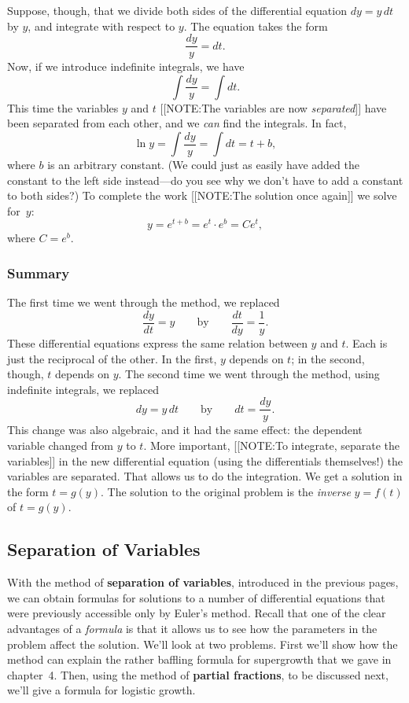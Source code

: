 Suppose, though, that we divide both sides of the differential
equation $dy = y \, dt$ by $y$, and integrate with respect to $y$.
The equation takes the form
	\[
\dfrac{dy}{y} = dt.
\]
Now, if we introduce indefinite integrals, we have
	\[
\int \dfrac{dy}{y} = \int dt.
\]
This time the variables $y$ and $t$ 
[[NOTE:The variables  are now \emph{separated}]]
have been separated from each other, and we {\em can\/} find the
integrals.  In fact,
	\[
\ln{y} = \int \dfrac{dy}{y} = \int dt = t + b,
\]
where $b$ is an arbitrary constant. (We could just as easily have
added the constant to the left side instead---do you see why we don't
have to add a constant to both sides?)  To complete the work 
[[NOTE:The solution  once again]]
we solve for~$y$:
	\[
y = e^{t + b} = e^t \cdot e^b = Ce^t,
\]
where $C = e^b$.


\subsubsection{Summary}
\label{subsubsec:summary}

The first time we went through the method, we replaced 
	\[
\dfrac{dy}{dt} = y \qquad \mbox{by} \qquad \dfrac{dt}{dy} = \dfrac{1}{y}.
\]
These differential equations express the same relation between $y$ and
$t$.  Each is just the reciprocal of the other.  In the first, $y$
depends on $t$; in the second, though, $t$ depends on $y$.  The second
time we went through the method, using indefinite integrals, we
replaced
	\[
dy = y \, dt \qquad \mbox{by} \qquad dt = \dfrac{dy}{y}.
\]
This change was also algebraic, and it had the same effect: the
dependent variable changed from $y$ to $t$.  More important,
[[NOTE:To integrate,  separate the variables]]
in the new differential equation (using the differentials themselves!)
the variables are separated.  That allows us to do the integration.
We get a solution in the form $t = g(y)$.  The solution to the
original problem is the {\em inverse\/} $y = f(t)$ of $t = g(y)$.

\subsection{Separation of Variables}
\label{subsec:separation-of-variables}

With the method of {\bf separation of variables}, introduced in the
previous pages, we can obtain formulas for solutions to a number of
differential equations that were previously accessible only by Euler's
method.  Recall that one of the clear advantages of a {\em formula\/}
is that it allows us to see how the parameters in the problem affect
the solution.  We'll look at two problems.  First we'll show how the
method can explain the rather baffling formula for supergrowth that we
gave in chapter~4.  Then, using the method of {\bf partial fractions},
to be discussed next, we'll give a formula for logistic growth.

